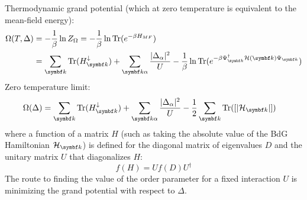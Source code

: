 \documentclass[../notes.tex]{subfiles}
\begin{document}
Thermodynamic grand potential (which at zero temperature is equivalent to the mean-field energy):
\begin{align}
	\Omega (T, \Delta) &= -\frac{1}{\beta} \ln{Z_{\Omega}} = -\frac{1}{\beta} \ln{\Tr(e^{-\beta H_{MF}})} \\
	&= \sum_{\vb{k}} \Tr(H^{\downarrow}_{\vb{k}}) + \sum_{\vb{k} \alpha} \frac{\vert \Delta_{\alpha} \vert^2}{U} - \frac{1}{\beta} \ln{\Tr(e^{-\beta \Psi_{\vb{k}}^{\dagger} \mathcal{H} (\vb{k}) \Psi_{\vb{k}}})}
\end{align}
Zero temperature limit:
\begin{align}
	\Omega (\Delta) &= \sum_{\vb{k}} \Tr(H^{\downarrow}_{\vb{k}}) + \sum_{\vb{k} \alpha} \frac{\vert \Delta_{\alpha} \vert^2}{U} - \frac{1}{2} \sum_{\vb{k}} \Tr([\vert \mathcal{H}_{\vb{k}} \vert])
\end{align}
where a function of a matrix \(H\) (such as taking the absolute value of the BdG Hamiltonian \(\mathcal{H}_{\vb{k}}\)) is defined for the diagonal matrix of eigenvalues \(D\) and the unitary matrix \(U\) that diagonalizes \(H\):
\begin{equation}
	f(H) = U f(D) U^{\dagger}
\end{equation}
The route to finding the value of the order parameter for a fixed interaction \(U\) is minimizing the grand potential with respect to \(\Delta\).
\end{document}
